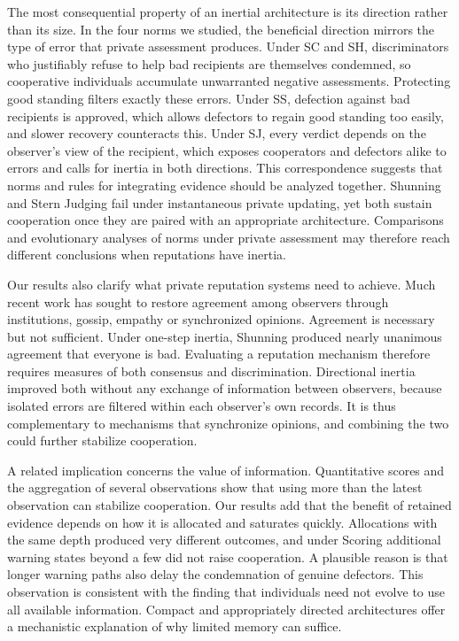 \documentclass[fleqn,10pt]{wlscirep}
\theoremstyle{plain}
\begin{document}
The most consequential property of an inertial architecture is its direction rather than its size. In the four norms we studied, the beneficial direction mirrors the type of error that private assessment produces. Under SC and SH, discriminators who justifiably refuse to help bad recipients are themselves condemned, so cooperative individuals accumulate unwarranted negative assessments. Protecting good standing filters exactly these errors. Under SS, defection against bad recipients is approved, which allows defectors to regain good standing too easily, and slower recovery counteracts this. Under SJ, every verdict depends on the observer's view of the recipient, which exposes cooperators and defectors alike to errors and calls for inertia in both directions. This correspondence suggests that norms and rules for integrating evidence should be analyzed together. Shunning and Stern Judging fail under instantaneous private updating, yet both sustain cooperation once they are paired with an appropriate architecture. Comparisons and evolutionary analyses of norms under private assessment\cite{kessinger2023,murase2024computational} may therefore reach different conclusions when reputations have inertia.

Our results also clarify what private reputation systems need to achieve. Much recent work has sought to restore agreement among observers through institutions, gossip, empathy or synchronized opinions\cite{radzvilavicius2021,kawakatsu2024,radzvilavicius2019,murase2024synchronization,tham2026}. Agreement is necessary but not sufficient. Under one-step inertia, Shunning produced nearly unanimous agreement that everyone is bad. Evaluating a reputation mechanism therefore requires measures of both consensus and discrimination. Directional inertia improved both without any exchange of information between observers, because isolated errors are filtered within each observer's own records. It is thus complementary to mechanisms that synchronize opinions, and combining the two could further stabilize cooperation.

A related implication concerns the value of information. Quantitative scores and the aggregation of several observations show that using more than the latest observation can stabilize cooperation\cite{schmid2023,clark2020,michelmata2024}. Our results add that the benefit of retained evidence depends on how it is allocated and saturates quickly. Allocations with the same depth produced very different outcomes, and under Scoring additional warning states beyond a few did not raise cooperation. A plausible reason is that longer warning paths also delay the condemnation of genuine defectors. This observation is consistent with the finding that individuals need not evolve to use all available information\cite{michelmata2024}. Compact and appropriately directed architectures offer a mechanistic explanation of why limited memory can suffice.
\end{document}
